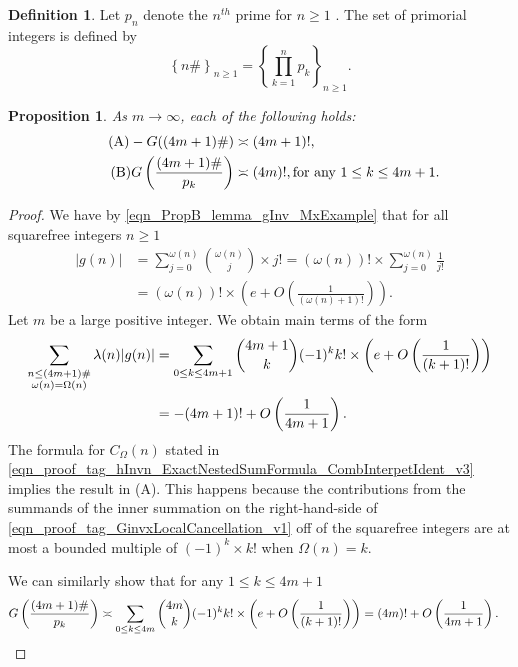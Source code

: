 \documentclass[11pt,reqno,a4letter]{article}
\numberwithin{equation}{section}
\numberwithin{figure}{section}
\numberwithin{table}{section}
\newcommand{\seqnum}[1]{\href{http://oeis.org/#1}{\color{ProcessBlue}{\underline{#1}}}}
\theoremstyle{plain}
\newtheorem{prop}[theorem]{Proposition}
\numberwithin{theorem}{section}
\theoremstyle{definition}
\newtheorem{definition}[theorem]{Definition}
\theoremstyle{remark}
\newcommand{\mathtext}[1]{\text{\rm #1}}
\begin{document}
\begin{definition}
Let $p_n$ denote the $n^{th}$ prime for $n \geq 1$ 
\cite[\seqnum{A000040}]{OEIS}. 
The set of primorial integers is defined by  
\cite[\seqnum{A002110}]{OEIS} 
\[
\left\{n\#\right\}_{n \geq 1} = \left\{\prod_{k=1}^{n} p_k\right\}_{n \geq 1}. 
\]
\end{definition}

\begin{prop}
\label{theorem_PrimorialSeqGInvCalcs_v1} 
As $m \rightarrow \infty$, each of the following holds: 
\begin{align} 
\tag{A} 
-G((4m+1)\#) & \asymp (4m+1)!, \\ 
\tag{B} 
G\left(\frac{(4m+1)\#}{p_k}\right) & \asymp (4m)!, 
     \mathtext{ for any } 1 \leq k \leq 4m+1. 
\end{align} 
\end{prop}
\begin{proof} 
We have by \eqref{eqn_PropB_lemma_gInv_MxExample} 
that for all squarefree integers $n \geq 1$ 
\begin{align*} 
|g(n)| & = \sum_{j=0}^{\omega(n)} \binom{\omega(n)}{j} \times j! 
     = (\omega(n))! \times \sum_{j=0}^{\omega(n)} \frac{1}{j!} \\ 
     & = (\omega(n))! \times \left(e + O\left(\frac{1}{(\omega(n)+1)!}\right)\right). 
\end{align*} 
Let $m$ be a large positive integer. 
We obtain main terms of the form 
\begin{align} 
\label{eqn_proof_tag_GinvxLocalCancellation_v1} 
\sum_{\substack{n \leq (4m+1)\# \\ \omega(n)=\Omega(n)}} \lambda(n) |g(n)| 
     & = \sum_{0 \leq k \leq 4m+1} \binom{4m+1}{k} (-1)^{k} k! \times 
     \left(e + O\left(\frac{1}{(k+1)!}\right)\right) \\ 
\notag 
     & = -(4m+1)! + O\left(\frac{1}{4m+1}\right). 
\end{align} 
The formula for $C_{\Omega}(n)$ stated in 
\eqref{eqn_proof_tag_hInvn_ExactNestedSumFormula_CombInterpetIdent_v3} 
implies the result in (A). 
This happens because the contributions from the summands of the inner 
summation on the right-hand-side of 
\eqref{eqn_proof_tag_GinvxLocalCancellation_v1} 
off of the squarefree integers 
are at most a bounded multiple of $(-1)^k \times k!$ when $\Omega(n) = k$. 

We can similarly show that for any $1 \leq k \leq 4m+1$ 
\begin{align*}
G\left(\frac{(4m+1)\#}{p_k}\right) & \asymp \sum_{0 \leq k \leq 4m} \binom{4m}{k} (-1)^{k} k! 
     \times \left(e + O\left(\frac{1}{(k+1)!}\right)\right) = (4m)! + O\left(\frac{1}{4m+1}\right). 
     \qedhere 
\end{align*}
\end{proof}
\end{document}
